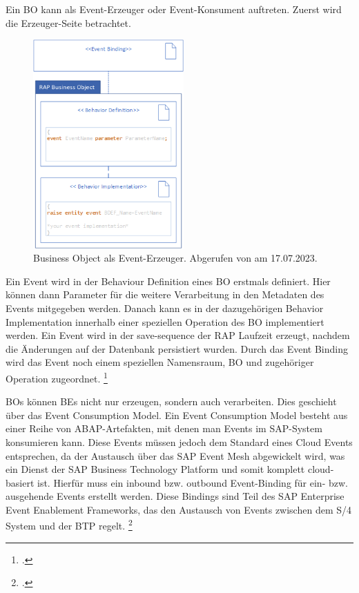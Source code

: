 Ein BO kann als Event-Erzeuger oder Event-Konsument auftreten. Zuerst wird die Erzeuger-Seite betrachtet.

\begin{figure}[H]
 \centering
 \includegraphics[height=8cm]{Bilder/Business-Events_BO-as-event-consumer.png}
 \caption[Business Object als Event-Erzeuger]{Business Object als Event-Erzeuger. Abgerufen von \cite{sap_business-events_2023} am 17.07.2023.}
 \label{fig:iso_norm}
\end{figure}

Ein Event wird in der Behaviour Definition eines BO erstmals definiert. Hier können dann Parameter für die weitere Verarbeitung in den Metadaten des Events mitgegeben werden. Danach kann es in der dazugehörigen Behavior Implementation innerhalb einer speziellen Operation des BO implementiert werden. Ein Event wird in der save-sequence der RAP Laufzeit erzeugt, nachdem die Änderungen auf der Datenbank persistiert wurden. Durch das Event Binding wird das Event noch einem speziellen Namensraum, BO und zugehöriger Operation zugeordnet. \footcite[Vgl.][]{sap_business-events_2023}

BOs können BEs nicht nur erzeugen, sondern auch verarbeiten. Dies geschieht über das Event Consumption Model. Ein Event Consumption Model besteht aus einer Reihe von ABAP-Artefakten, mit denen man Events im SAP-System konsumieren kann. Diese Events müssen jedoch dem Standard eines Cloud Events entsprechen, da der Austausch über das SAP Event Mesh abgewickelt wird, was ein Dienst der SAP Business Technology Platform und somit komplett cloud-basiert ist. Hierfür muss ein inbound bzw. outbound Event-Binding für ein- bzw. ausgehende Events erstellt werden. Diese Bindings sind Teil des SAP Enterprise Event Enablement Frameworks, das den Austausch von Events zwischen dem S/4 System und der BTP regelt. \footcite[Vgl.][]{sap_creating_2022}

